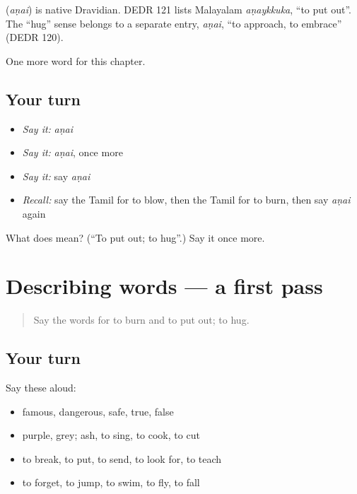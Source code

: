 \begin{cousinweb}
\textbf{} (\emph{aṇai}) is native Dravidian. DEDR 121 lists Malayalam \emph{aṇaykkuka}, \textquotedblleft{}to put out\textquotedblright{}. The \textquotedblleft{}hug\textquotedblright{} sense belongs to a separate entry, \emph{aṇai}, \textquotedblleft{}to approach, to embrace\textquotedblright{} (DEDR 120).
\end{cousinweb}

\begin{grammarlens}[title={What you've built}]
One more word for this chapter.
\end{grammarlens}

\subsection*{Your turn}
\begin{itemize}
\raggedright
  \item \emph{Say it:} \emph{aṇai}
  \item \emph{Say it:} \emph{aṇai}, once more
  \item \emph{Say it:} say \emph{aṇai}
  \item \emph{Recall:} say the Tamil for to blow, then the Tamil for to burn, then say \emph{aṇai} again
\end{itemize}

\begin{tcolorbox}[breakable,colback=teal!4,colframe=teal!35!black,title={Before you move on}]
What does  mean? (\textquotedblleft{}To put out; to hug\textquotedblright{}.) Say it once more.
\end{tcolorbox}
\section[(dialogue)]{Describing words — a first pass}

\label{lesson:TA-R157-first-pass-describing-words}



\begin{quote}
Say the words for to burn and to put out; to hug.
\end{quote}

\subsection*{Your turn}
Say these aloud:

\begin{itemize}
\raggedright
  \item famous, dangerous, safe, true, false
  \item purple, grey; ash, to sing, to cook, to cut
  \item to break, to put, to send, to look for, to teach
  \item to forget, to jump, to swim, to fly, to fall
\end{itemize}

